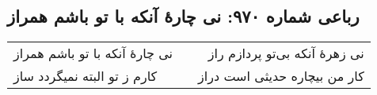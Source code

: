 \begin{center}
\section*{رباعی شماره ۹۷۰: نی چارهٔ آنکه با تو باشم همراز}
\label{sec:0970}
\begin{longtable}{l p{0.5cm} r}
نی چارهٔ آنکه با تو باشم همراز
&&
نی زهرهٔ آنکه بی‌تو پردازم راز
\\
کارم ز تو البته نمیگردد ساز
&&
کار من بیچاره حدیثی است دراز
\\
\end{longtable}
\end{center}
